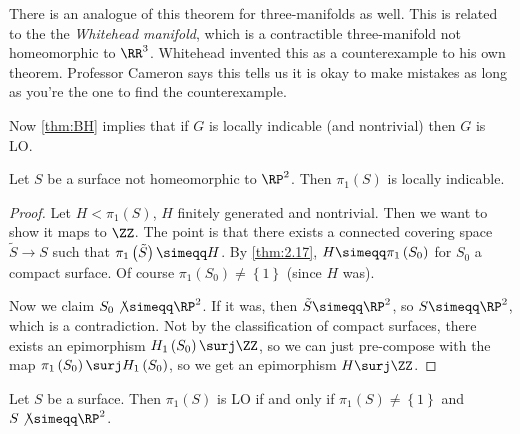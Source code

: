 
\begin{rmk}
There is an analogue of this theorem for three-manifolds as well. This is related to the
the \emph{Whitehead manifold}, which is 
a contractible three-manifold not homeomorphic to $\RR^3$. Whitehead invented this as a
counterexample to his own theorem. Professor Cameron says this tells us it is okay to make
mistakes as long as you're the one to find the counterexample.
\end{rmk}

\begin{rmk}
Now \cref{thm:BH}
implies that if $G$ is locally indicable (and nontrivial) then $G$ is LO.
\end{rmk}

\begin{thm}
Let $S$ be a surface not homeomorphic to $\RP^2$. Then $\pi_1\left(S\right)$ is locally
indicable.
\end{thm}

\begin{proof}
Let $H < \pi_1\left(S\right)$, $H$ finitely generated and nontrivial.
Then we want to show it maps to $\ZZ$. The point is that there exists a connected covering
space $\tilde S \to S$ such that $\pi_1\left(\tilde S\right)\simeqq H$. By
\cref{thm:2.17}, $H\simeqq \pi_1\left(S_0\right)$ for $S_0$ a compact surface. Of course
$\pi_1\left(S_0\right)\neq \left\{1\right\}$ (since $H$ was).

Now we claim $S_0\not\simeqq \RP^2$. If it was, then $\tilde S\simeqq \RP^2$, so $S\simeqq
\RP^2$, which is a contradiction. Not by the classification of compact surfaces, there
exists an epimorphism $H_1\left(S_0\right) \surj \ZZ$, 
so we can just pre-compose with the map $\pi_1\left(S_0\right)
\surj H_1\left(S_0\right)$, so we get an epimorphism $H\surj \ZZ$.
\end{proof}

\begin{cor}
Let $S$ be a surface. Then $\pi_1\left(S\right)$ is LO 
if and only if $\pi_1\left(S\right)\neq \left\{1\right\}$ and $S\not\simeqq \RP^2$.
\label{cor:2.19}
\end{cor}

